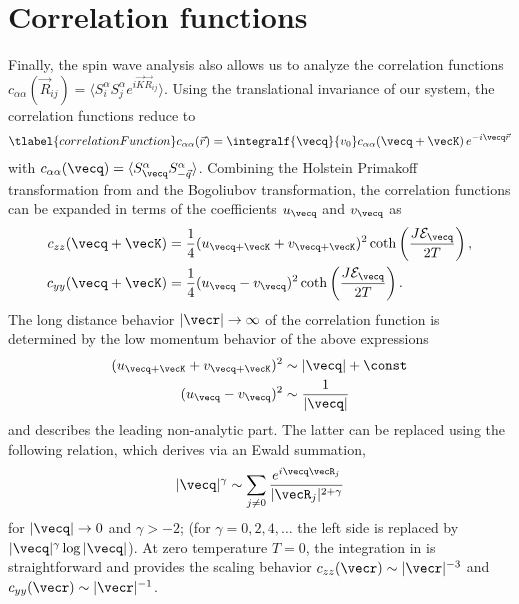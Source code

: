 \section{Correlation functions}
Finally, the spin wave analysis also allows us to analyze the correlation functions
 $c_{\alpha\alpha}({\vec R}_{ij})=\langle S^\alpha_i S^\alpha_{j} e^{i {\vec K} {\vec R}_{i j}} \rangle$. Using
 the translational invariance of our system, the correlation functions reduce to
%
\begin{align} \tlabel{correlationFunction}
    c_{\alpha\alpha}({\vec r}) = \integralf{\vecq}{v_0} c_{\alpha\alpha}({\vecq+\vecK}) \, e^{-i {\vecq} {\vec r}}
\end{align}
%
with $c_{\alpha\alpha}({\vecq}) = \langle S^\alpha_{\vecq} S^\alpha_{-\vec{q}}\rangle$.
Combining the Holstein Primakoff transformation from  and the Bogoliubov transformation,
the correlation functions can be expanded in terms of the coefficients $u_{\vecq}$ and $v_{\vecq}$ as
%
\begin{align}
c_{zz}({\vecq+\vecK}) &= \frac{1}{4} (u_{\vecq+\vecK}+v_{\vecq+\vecK})^2 \coth\left(\frac{J \mathcal{E}_{\vecq}}{2T}\right) , \\
c_{yy}({\vecq+\vecK}) &= \frac{1}{4}  (u_{\vecq}-v_{\vecq})^2 \coth\left(\frac{J \mathcal{E}_{\vecq}}{2T}\right) .
\end{align}
%
The long distance behavior $|{\vecr}| \rightarrow \infty$ of the correlation function is determined by the low momentum
behavior of the above expressions
%
\begin{align}
(u_{\vecq+\vecK}+v_{\vecq+\vecK})^2 &\sim |{\vecq}|+\const \\
(u_{\vecq}-v_{\vecq})^2 &\sim\frac{ 1}{|{\vecq}|}
\end{align}
%
and describes the leading non-analytic part.
The latter can be replaced using the following relation, which derives via an Ewald summation,
%
\begin{align}
   |{\vecq}|^{\gamma} \sim \sum_{j \neq 0}\frac{e^{i {\vecq} {\vecR}_{j}}}{|{\vecR}_{j}|^{2+\gamma}}
\end{align}
%
for $|{\vecq}|\rightarrow 0$ and $\gamma >-2$; (for $\gamma = 0,2,4,\ldots$ the left side is replaced by $|{\vecq}|^\gamma \log |{\vecq}|$).
At zero temperature $T=0$, the integration in 
is straightforward and provides the scaling behavior  $c_{zz}({\vecr}) \sim |{\vecr}|^{-3}$ and $c_{yy}({\vecr}) \sim |{\vecr}|^{-1}$.

